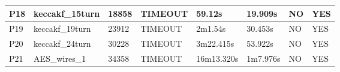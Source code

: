 \documentclass[pagesize, english, fontsize=10pt, DIV=25]{scrartcl}
\begin{document}
\begin{table}[]
{\begin{tabular}{|l|l|l|l|l|l|l|l|}
P18                              & keccakf\_15turn                               & 18858                & TIMEOUT      & 59.12s     & 19.909s        & NO                             & YES                             \\ \hline
P19                              & keccakf\_19turn                               & 23912                & TIMEOUT      & 2m1.54s    & 30.453s        & NO                             & YES                             \\ \hline
P20                              & keccakf\_24turn                               & 30228                & TIMEOUT      & 3m22.415s  & 53.922s        & NO                             & YES                             \\ \hline
P21                              & AES\_wires\_1                                 & 34358                & TIMEOUT      & 16m13.320s & 1m7.976s       & NO                             & YES                            \\ \hline
\end{tabular}}
\end{table}
\end{document}
